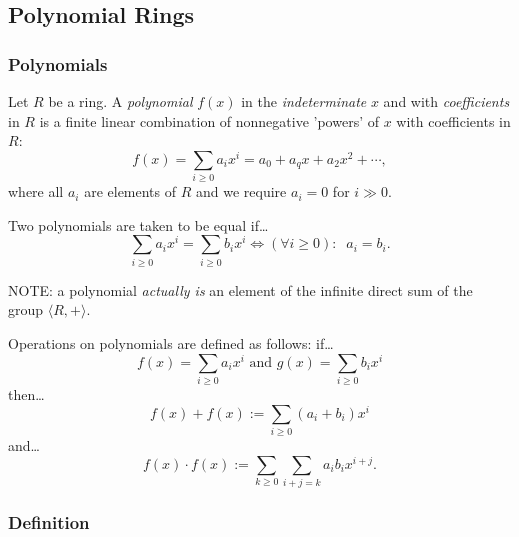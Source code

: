 \subsection{Polynomial Rings}\label{polynomialrings}

\subsubsection{Polynomials}\label{polynomials}
Let $R$ be a ring. A \emph{polynomial} $f(x)$ in the \emph{indeterminate} $x$ and with \emph{coefficients} in $R$
is a finite linear combination of nonnegative 'powers' of $x$ with coefficients in $R$:
$$f(x) = \sum_{i \geq 0} a_i x^i = a_0 + a_qx+a_2x^2 + \cdots,$$
where all $a_i$ are elements of $R$ and we require $a_i = 0$ for $i \gg 0.$\newline

\noindent Two polynomials are taken to be equal if\dots
$$\sum_{i \geq 0} a_i x^i = \sum_{i \geq 0} b_i x^i \Leftrightarrow (\forall i \geq 0): \; \; a_i = b_i.$$

\noindent NOTE: a polynomial \emph{actually is} an element of the infinite direct sum of the group $\langle R,+ \rangle$.\newline

Operations on polynomials are defined as follows: if\dots
$$f(x) = \sum_{i \geq 0} a_i x^i \textrm{ and } g(x) = \sum_{i \geq 0} b_i x^i$$
then\dots
$$f(x) + f(x) := \sum_{i \geq 0} (a_i + b_i) x^i$$
and\dots
$$f(x) \cdot f(x) := \sum_{k \geq 0}\sum_{i+j = k} a_ib_ix^{i+j}.$$

\subsubsection{Definition}\label{polynomialrings}

